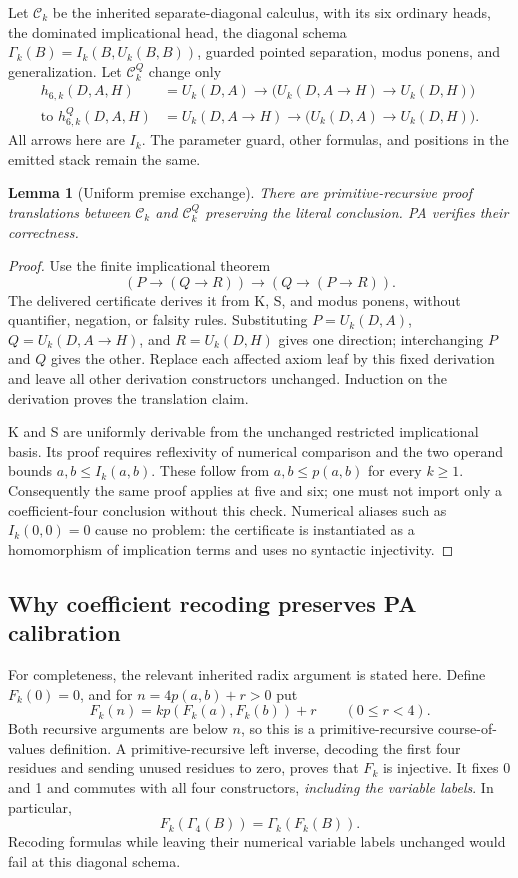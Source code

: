\documentclass[11pt,letterpaper]{article}
\newtheorem{lemma}[theorem]{Lemma}
\begin{document}
Let $\mathcal C_k$ be the inherited separate-diagonal calculus, with its
six ordinary heads, the dominated implicational head, the diagonal schema
$\Gamma_k(B)=I_k(B,U_k(B,B))$, guarded pointed separation, modus ponens,
and generalization. Let $\mathcal C_k^Q$ change only
\begin{align*}
h_{6,k}(D,A,H)
 &= U_k(D,A)\to\bigl(U_k(D,A\to H)\to U_k(D,H)\bigr)\\
\text{to }h_{6,k}^{Q}(D,A,H)
 &= U_k(D,A\to H)\to\bigl(U_k(D,A)\to U_k(D,H)\bigr).
\end{align*}
All arrows here are $I_k$. The parameter guard, other formulas, and
positions in the emitted stack remain the same.

\begin{lemma}[Uniform premise exchange]
There are primitive-recursive proof translations between
$\mathcal C_k$ and $\mathcal C_k^Q$ preserving the literal conclusion.
PA verifies their correctness.
\end{lemma}
\begin{proof}
Use the finite implicational theorem
\[
 (P\to(Q\to R))\to(Q\to(P\to R)).
\]
The delivered certificate derives it from K, S, and modus ponens, without
quantifier, negation, or falsity rules. Substituting
$P=U_k(D,A)$, $Q=U_k(D,A\to H)$, and $R=U_k(D,H)$ gives one direction;
interchanging $P$ and $Q$ gives the other. Replace each affected axiom
leaf by this fixed derivation and leave all other derivation constructors
unchanged. Induction on the derivation proves the translation claim.

K and S are uniformly derivable from the unchanged restricted
implicational basis. Its proof requires reflexivity of numerical
comparison and the two operand bounds
$a,b\leq I_k(a,b)$. These follow from $a,b\leq p(a,b)$ for every $k\geq1$.
Consequently the same proof applies at five and six; one must not import
only a coefficient-four conclusion without this check. Numerical aliases
such as $I_k(0,0)=0$ cause no problem: the certificate is instantiated as
a homomorphism of implication terms and uses no syntactic injectivity.
\end{proof}

\subsection{Why coefficient recoding preserves PA calibration}

For completeness, the relevant inherited radix argument is stated here.
Define $F_k(0)=0$, and for $n=4p(a,b)+r>0$ put
\[
 F_k(n)=kp(F_k(a),F_k(b))+r\qquad(0\leq r<4).
\]
Both recursive arguments are below $n$, so this is a primitive-recursive
course-of-values definition. A primitive-recursive left inverse, decoding
the first four residues and sending unused residues to zero, proves that
$F_k$ is injective. It fixes 0 and 1 and commutes with all four constructors,
\emph{including the variable labels}. In particular,
\[
 F_k(\Gamma_4(B))=\Gamma_k(F_k(B)).
\]
Recoding formulas while leaving their numerical variable labels unchanged
would fail at this diagonal schema.
\end{document}
